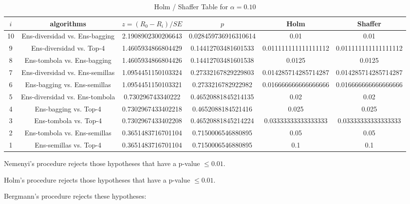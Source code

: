 \documentclass[a4paper,10pt]{article}
\begin{document}
\begin{landscape}
\begin{table}[!htp]
\centering\tiny
\caption{Holm / Shaffer Table for $\alpha=0.10$}
\begin{tabular}{cccccc}
$i$&algorithms&$z=(R_0 - R_i)/SE$&$p$&Holm&Shaffer\\
\hline
10&Ens-diversidad vs. Ens-bagging&2.1908902300206643&0.028459736916310614&0.01&0.01\\
9&Ens-diversidad vs. Top-4&1.4605934866804429&0.14412703481601533&0.011111111111111112&0.011111111111111112\\
8&Ens-tombola vs. Ens-bagging&1.4605934866804426&0.14412703481601538&0.0125&0.0125\\
7&Ens-diversidad vs. Ens-semillas&1.0954451150103324&0.27332167829229803&0.014285714285714287&0.014285714285714287\\
6&Ens-bagging vs. Ens-semillas&1.0954451150103321&0.2733216782922982&0.016666666666666666&0.016666666666666666\\
5&Ens-diversidad vs. Ens-tombola&0.730296743340222&0.46520881845214135&0.02&0.02\\
4&Ens-bagging vs. Top-4&0.7302967433402218&0.4652088184521416&0.025&0.025\\
3&Ens-tombola vs. Top-4&0.7302967433402208&0.46520881845214224&0.03333333333333333&0.03333333333333333\\
2&Ens-tombola vs. Ens-semillas&0.3651483716701104&0.7150006546880895&0.05&0.05\\
1&Ens-semillas vs. Top-4&0.3651483716701104&0.7150006546880895&0.1&0.1\\
\hline
\end{tabular}
\end{table}
Nemenyi's procedure rejects those hypotheses that have a p-value $\le0.01$.


Holm's procedure rejects those hypotheses that have a p-value $\le0.01$.


Bergmann's procedure rejects these hypotheses:


\begin{itemize}


\end{itemize}



\end{landscape}
\end{document}
